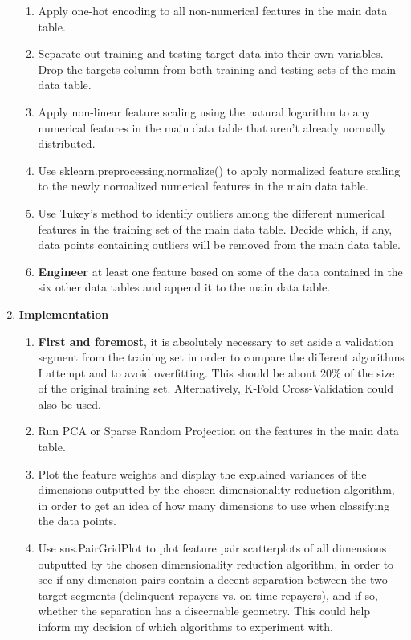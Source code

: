 \documentclass[12pt, letterpaper]{article}
\begin{document}
\begin{enumerate}
\begin{enumerate}
      \item Apply one-hot encoding to all non-numerical features in the main data table.
      \item Separate out training and testing target data into their own variables. Drop the targets column from both training and testing sets of the main data table.
      \item Apply non-linear feature scaling using the natural logarithm to any numerical features in the main data table that aren't already normally distributed.
      \item Use sklearn.preprocessing.normalize() to apply normalized feature scaling to the newly normalized numerical features in the main data table.
      \item Use Tukey's method to identify outliers among the different numerical features in the training set of the main data table. Decide which, if any, data points containing outliers will be removed from the main data table.
      \item \textbf{Engineer} at least one feature based on some of the data contained in the six other data tables and append it to the main data table.
    \end{enumerate}
  \item \textbf{Implementation}
    \begin{enumerate}
      \item \textbf{First and foremost}, it is absolutely necessary to set aside a validation segment from the training set in order to compare the different algorithms I attempt and to avoid overfitting. This should be about 20\% of the size of the original training set. Alternatively, K-Fold Cross-Validation could also be used.
      \item Run PCA or Sparse Random Projection on the features in the main data table.
      \item Plot the feature weights and display the explained variances of the dimensions outputted by the chosen dimensionality reduction algorithm, in order to get an idea of how many dimensions to use when classifying the data points.
      \item Use sns.PairGridPlot to plot feature pair scatterplots of all dimensions outputted by the chosen dimensionality reduction algorithm, in order to see if any dimension pairs contain a decent separation between the two target segments (delinquent repayers vs. on-time repayers), and if so, whether the separation has a discernable geometry. This could help inform my decision of which algorithms to experiment with.

\end{enumerate}
\end{enumerate}
\end{document}
